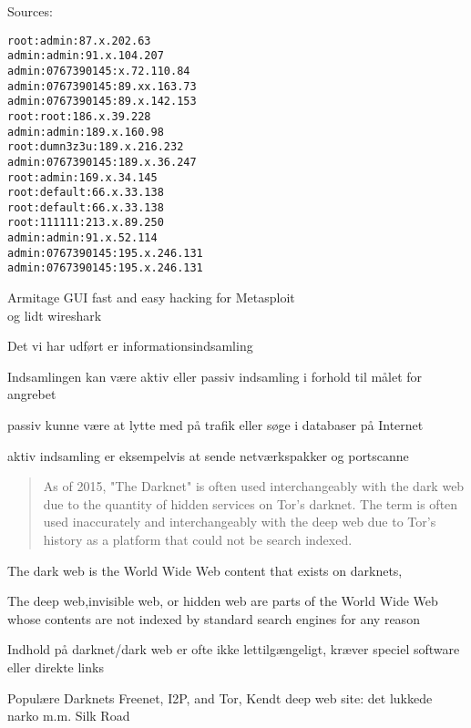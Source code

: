 \documentclass[20pt,landscape,a4paper]{foils}
\begin{document}
Sources: \\
{\footnotesize{}}



\begin{alltt}
root:admin:87.x.202.63
admin:admin:91.x.104.207
admin:0767390145:x.72.110.84
admin:0767390145:89.xx.163.73
admin:0767390145:89.x.142.153
root:root:186.x.39.228
admin:admin:189.x.160.98
root:dumn3z3u:189.x.216.232
admin:0767390145:189.x.36.247
root:admin:169.x.34.145
root:default:66.x.33.138
root:default:66.x.33.138
root:111111:213.x.89.250
admin:admin:91.x.52.114
admin:0767390145:195.x.246.131
admin:0767390145:195.x.246.131
\end{alltt}




Armitage GUI fast and easy hacking for Metasploit\\
 og lidt wireshark


\begin{list1}
\item Det vi har udført er informationsindsamling
\item Indsamlingen kan være aktiv eller passiv indsamling i forhold
  til målet for angrebet
\item passiv kunne være at lytte med på trafik eller søge i databaser
  på Internet
\item aktiv indsamling er eksempelvis at sende netværkspakker og portscanne
\end{list1}




\begin{quote}
  As of 2015, "The Darknet" is often used interchangeably with the dark web due to the quantity of hidden services on Tor's darknet. The term is often used inaccurately and interchangeably with the deep web due to Tor's history as a platform that could not be search indexed.
\end{quote}

\begin{list2}
\item The dark web is the World Wide Web content that exists on darknets,
\item The deep web,invisible web, or hidden web are parts of the World Wide Web whose contents are not indexed by standard search engines for any reason
\item Indhold på darknet/dark web er ofte ikke lettilgængeligt, kræver speciel software eller direkte links
\item Populære Darknets Freenet, I2P, and Tor, Kendt deep web site: det lukkede narko m.m. Silk Road 
\end{list2}
\end{document}
